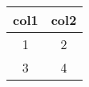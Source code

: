 \documentclass{article}
\begin{document}
\begin{tabular}{|c|c|}
\hline
col1 & col2 \\
\hline
1 & 2 \\
3 & 4 \\
\hline
\end{tabular}
\end{document}
